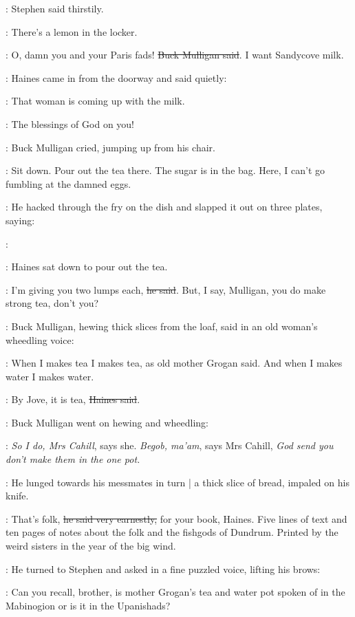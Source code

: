 :
Stephen said thirstily.

\Stephen:
There's a lemon in the locker.

\Mulligan:
O, damn you and your Paris fads!
\sout{Buck Mulligan said}.
I want Sandycove milk.

:
Haines came in from the doorway and said quietly:

\Haines:
That woman is coming up with the milk.

\Mulligan:
The blessings of God on you!

:
Buck Mulligan cried,
jumping up from his chair.

\Mulligan:
Sit down.
Pour out the tea there.
The sugar is in the bag.
Here, I can't go fumbling at the damned eggs.

:
He hacked through the fry on the dish
and slapped it out on three plates,
saying:

\Mulligan:

:
Haines sat down to pour out the tea.

\Haines:
I'm giving you two lumps each,
\sout{he said}.
But, I say, Mulligan, you do make strong tea, don't you?

:
Buck Mulligan,
hewing thick slices from the loaf,
said in an old woman's wheedling voice:

\Mulligan:
When I makes tea I makes tea, as old mother Grogan said.
And when I makes water I makes water.

\Haines:
By Jove, it is tea,
\sout{Haines said}.

:
Buck Mulligan went on hewing and wheedling:

\Mulligan:
\emph{So I do, Mrs Cahill}\/,
says she.
\emph{Begob, ma'am}\/,
says Mrs Cahill,
\emph{God send you don't make them in the one pot.}

:
He lunged towards his messmates in turn |
a thick slice of bread, impaled on his knife.

\Mulligan:
That's folk,
\sout{he said very earnestly,}
for your book, Haines.
Five lines of text and ten pages of notes
about the folk and the fishgods of Dundrum.
Printed by the weird sisters in the year of the big wind.

:
He turned to Stephen and asked in a fine puzzled voice,
lifting his brows:

\Mulligan:
Can you recall, brother,
is mother Grogan's tea and water pot spoken of in the Mabinogion
or is it in the Upanishads?

